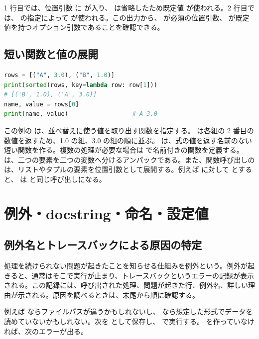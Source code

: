 1 行目では、位置引数  に  が入り、 は省略したため既定値  が使われる。2 行目では、 の指定によって  が使われる。この出力から、 が必須の位置引数、 が既定値を持つオプション引数であることを確認できる。

\subsection{短い関数と値の展開}
\begin{lstlisting}[language=Python]
rows = [("A", 3.0), ("B", 1.0)]
print(sorted(rows, key=lambda row: row[1]))
# [('B', 1.0), ('A', 3.0)]
name, value = rows[0]
print(name, value)                  # A 3.0
\end{lstlisting}
この例の  は、並べ替えに使う値を取り出す関数を指定する。 は各組の 2 番目の数値を返すため、1.0 の組、3.0 の組の順に並ぶ。 は、式の値を返す名前のない短い関数を作る。複数の処理が必要な場合は  で名前付きの関数を定義する。 は、二つの要素を二つの変数へ分けるアンパックである。また、関数呼び出しの  は、リストやタプルの要素を位置引数として展開する。例えば  に対して  とすると、 は  と同じ呼び出しになる。

\section{例外・docstring・命名・設定値}

\subsection{例外名とトレースバックによる原因の特定}

処理を続けられない問題が起きたことを知らせる仕組みを例外という。例外が起きると、通常はそこで実行が止まり、トレースバックというエラーの記録が表示される。この記録には、呼び出された処理、問題が起きた行、例外名、詳しい理由が示される。原因を調べるときは、末尾から順に確認する。

例えば  ならファイルパスが違うかもしれないし、 なら想定した形式でデータを読めていないかもしれない。次を  として保存し、 で実行する。 を作っていなければ、次のエラーが出る。


